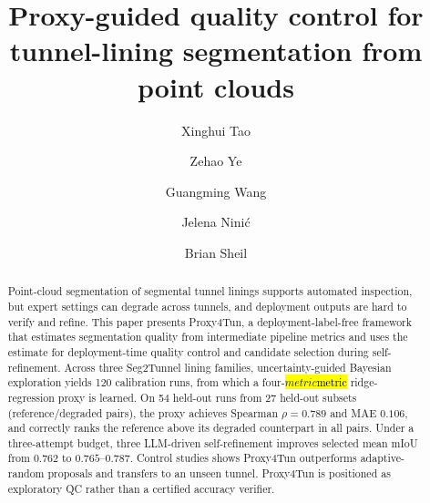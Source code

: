 \documentclass[a4paper,fleqn]{cas-dc}
\let\texthl\hl
\renewcommand{\hl}[1]{\ifmmode\colorbox{yellow}{\ensuremath{#1}}\else\texthl{#1}\fi}
\begin{document}
\let\WriteBookmarks\relax
\def\floatpagepagefraction{1}
\def\textpagefraction{.001}





\title[mode=title]{\texorpdfstring{Proxy-guided quality control for tunnel-lining segmentation from point clouds}{Proxy-guided quality control for tunnel-lining segmentation from point clouds}}

\author[1]{Xinghui Tao}

\author[2]{Zehao Ye}


\author[1]{Guangming Wang}
\cormark[1]

\author[2]{Jelena Nini\'{c}}

\author[1]{Brian Sheil}






\begin{abstract}
Point-cloud segmentation of segmental tunnel linings supports automated inspection, but expert settings can degrade across tunnels, and deployment outputs are hard to verify and refine. This paper presents Proxy4Tun, a deployment-label-free framework that estimates segmentation quality from intermediate pipeline metrics and uses the estimate for deployment-time quality control and candidate selection during self-refinement. Across three Seg2Tunnel lining families, uncertainty-guided Bayesian exploration yields 120 calibration runs, from which a four-\hl{metric} ridge-regression proxy is learned. On 54 held-out runs from 27 held-out subsets (reference/degraded pairs), the proxy achieves Spearman $\rho=0.789$ and MAE $0.106$, and correctly ranks the reference above its degraded counterpart in all pairs. Under a three-attempt budget, three LLM-driven self-refinement improves selected mean mIoU from $0.762$ to $0.765$--$0.787$. Control studies shows Proxy4Tun outperforms adaptive-random proposals and transfers to an unseen tunnel. Proxy4Tun is positioned as exploratory QC rather than a certified accuracy verifier.
\end{abstract}
\end{document}
